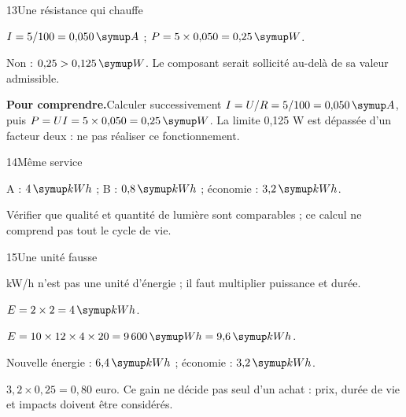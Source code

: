 \par\noindent\begin{minipage}{\linewidth}
\begin{corrige}{13}{Une résistance qui chauffe}
\begin{questions}
\item $I=5/100=0{,}050\unite A$ ; $P=5\times0{,}050=0{,}25\unite W$.
\item Non : $0{,}25>0{,}125\unite W$. Le composant serait sollicité au-delà de sa valeur admissible.
\end{questions}
\par\smallskip\noindent\textbf{Pour comprendre.}\enspace Calculer successivement $I=U/R=5/100=0{,}050\unite A$, puis $P=UI=5\times0{,}050=0{,}25\unite W$. La limite 0,125 W est dépassée d’un facteur deux : ne pas réaliser ce fonctionnement.\par
\end{corrige}
\end{minipage}
\par\noindent\begin{minipage}{\linewidth}
\begin{corrige}{14}{Même service}
\begin{questions}
\item A : $4\unite{kWh}$ ; B : $0{,}8\unite{kWh}$ ; économie : $3{,}2\unite{kWh}$.
\item Vérifier que qualité et quantité de lumière sont comparables ; ce calcul ne comprend pas tout le cycle de vie.
\end{questions}
\end{corrige}
\end{minipage}
\par\noindent\begin{minipage}{\linewidth}
\begin{corrige}{15}{Une unité fausse}
\begin{questions}
\item kW/h n’est pas une unité d’énergie ; il faut multiplier puissance et durée.
\item $E=2\times2=4\unite{kWh}$.
\end{questions}
\end{corrige}
\end{minipage}
\par\noindent\begin{minipage}{\linewidth}
\label{cor-defi-17}\begin{questions}
\item $E=10\times12\times4\times20=9\,600\unite{Wh}=9{,}6\unite{kWh}$.
\item Nouvelle énergie : $6{,}4\unite{kWh}$ ; économie : $3{,}2\unite{kWh}$.
\item $3{,}2\times0{,}25=0{,}80$ euro. Ce gain ne décide pas seul d’un achat : prix, durée de vie et impacts doivent être considérés.
\end{questions}
\end{minipage}
